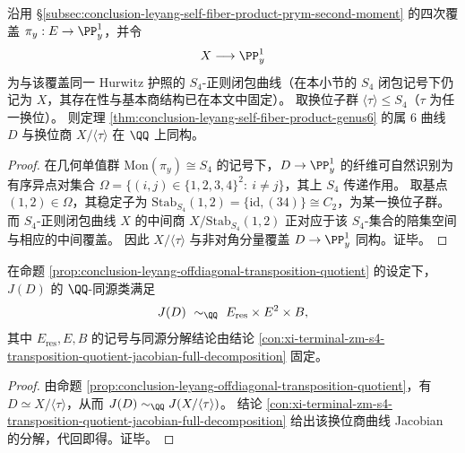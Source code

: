 \begin{proposition}[非对角自纤维积分量的换位商实现]\label{prop:conclusion-leyang-offdiagonal-transposition-quotient}
沿用 \S\ref{subsec:conclusion-leyang-self-fiber-product-prym-second-moment} 的四次覆盖 \(\pi_y:E\to\PP^1_y\)，并令
\[
X\longrightarrow \PP^1_y
\]
为与该覆盖同一 Hurwitz 护照的 \(S_4\)-正则闭包曲线（在本小节的 \(S_4\) 闭包记号下仍记为 \(X\)，其存在性与基本商结构已在本文中固定）。
取换位子群 \(\langle\tau\rangle\le S_4\)（\(\tau\) 为任一换位）。
则定理 \ref{thm:conclusion-leyang-self-fiber-product-genus6} 的属 \(6\) 曲线 \(D\) 与换位商 \(X/\langle\tau\rangle\) 在 \(\QQ\) 上同构。
\end{proposition}
\begin{proof}
在几何单值群 \(\mathrm{Mon}(\pi_y)\cong S_4\) 的记号下，\(D\to\PP^1_y\) 的纤维可自然识别为有序异点对集合
\(
\Omega=\{(i,j)\in\{1,2,3,4\}^2:\ i\neq j\}
\)，其上 \(S_4\) 传递作用。
取基点 \((1,2)\in\Omega\)，其稳定子为
\(
\mathrm{Stab}_{S_4}(1,2)=\{\mathrm{id},(34)\}\cong C_2
\)，为某一换位子群。
而 \(S_4\)-正则闭包曲线 \(X\) 的中间商 \(X/\mathrm{Stab}_{S_4}(1,2)\) 正对应于该 \(S_4\)-集合的陪集空间与相应的中间覆盖。
因此 \(X/\langle\tau\rangle\) 与非对角分量覆盖 \(D\to\PP^1_y\) 同构。证毕。
\end{proof}

\begin{corollary}\label{cor:conclusion-leyang-transposition-quotient-jacobian-decomposition}
在命题 \ref{prop:conclusion-leyang-offdiagonal-transposition-quotient} 的设定下，\(J(D)\) 的 \(\QQ\)-同源类满足
\[
J(D)\ \sim_{\QQ}\ E_{\mathrm{res}}\times E^2\times B,
\]
其中 \(E_{\mathrm{res}},E,B\) 的记号与同源分解结论由结论 \ref{con:xi-terminal-zm-s4-transposition-quotient-jacobian-full-decomposition} 固定。
\end{corollary}
\begin{proof}
由命题 \ref{prop:conclusion-leyang-offdiagonal-transposition-quotient}，有 \(D\simeq X/\langle\tau\rangle\)，从而 \(J(D)\sim_{\QQ}J(X/\langle\tau\rangle)\)。
结论 \ref{con:xi-terminal-zm-s4-transposition-quotient-jacobian-full-decomposition} 给出该换位商曲线 Jacobian 的分解，代回即得。证毕。
\end{proof}

